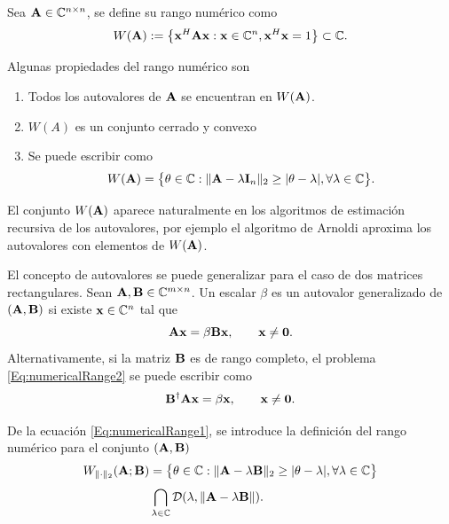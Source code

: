 		\begin{definition}
			Sea $\mathbf{A}\in\mathbb{C}^{n\times n}$, se define su rango numérico como
			\begin{equation}
				W(\mathbf{A}) := \big\{\mathbf{x}^H\mathbf{A}\mathbf{x}:\mathbf{x}\in\mathbb{C}^n,\mathbf{x}^H\mathbf{x} = 1\big\}\subset\mathbb{C}.
				\label{Eq:numericalRange}
			\end{equation}
		\end{definition}
		Algunas propiedades del rango numérico son
		\begin{enumerate}
		\item Todos los autovalores de $\mathbf{A}$ se encuentran en $W(\mathbf{A})$.
		\item $W(A)$ es un conjunto cerrado y convexo
		\item Se puede escribir como \cite{Bonsall1971}
		\begin{equation}
			W(\mathbf{A}) = \big\{\theta\in\mathbb{C}:\|\mathbf{A}-\lambda\mathbf{I}_n\|_2\ge|\theta-\lambda|,\forall\lambda\in\mathbb{C}\big\}.
			\label{Eq:numericalRange1}
		\end{equation}
		\end{enumerate}
		El conjunto $W(\mathbf{A})$ aparece naturalmente en los algoritmos de estimación recursiva de los autovalores, por ejemplo el algoritmo de Arnoldi \cite{Arnoldi1951} aproxima los autovalores con elementos de $W(\mathbf{A})$.
		
		El concepto de autovalores se puede generalizar para el caso de dos matrices rectangulares. Sean $\mathbf{A},\mathbf{B}\in\mathbb{C}^{m\times n}$. Un escalar $\beta$ es un autovalor generalizado de $(\mathbf{A},\mathbf{B})$ si existe $\mathbf{x}\in\mathbb{C}^n$ tal que
		\begin{equation}
			\mathbf{A}\mathbf{x} = \beta\mathbf{B}\mathbf{x}, \qquad \mathbf{x}\neq\mathbf{0}.
			\label{Eq:numericalRange2}
		\end{equation}
		Alternativamente, si la matriz $\mathbf{B}$ es de rango completo, el problema \eqref{Eq:numericalRange2} se puede escribir como
		\begin{equation}
			\mathbf{B}^\dagger\mathbf{A}\mathbf{x} = \beta\mathbf{x}, \qquad \mathbf{x}\neq\mathbf{0}.
			\label{Eq:numericalRange4}
		\end{equation}
		
		
		De la ecuación \eqref{Eq:numericalRange1}, se introduce la definición del rango numérico para el conjunto $(\mathbf{A},\mathbf{B})$ \cite{Chorianopoulos2009}
		\begin{equation}
			\begin{aligned}
			W_{\|\cdot\|_2}(\mathbf{A};\mathbf{B}) & = \big\{\theta\in\mathbb{C}:\|\mathbf{A}-\lambda\mathbf{B}\|_2\ge|\theta-\lambda|,\forall\lambda\in\mathbb{C}\big\}\\[0.3em]
			& \bigcap_{\lambda\in\mathbb{C}}\mathcal{D}(\lambda,\|\mathbf{A}-\lambda\mathbf{B}\|).
			\end{aligned}
			\label{Eq:numericalRange3}
		\end{equation}
		

